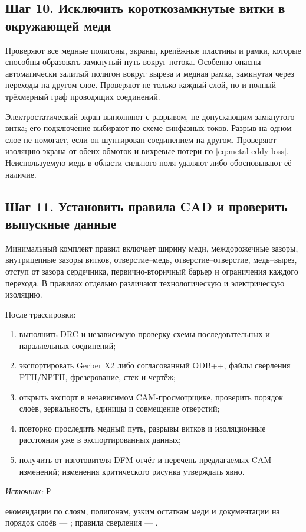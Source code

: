 \documentclass[14pt,a4paper]{extarticle}
\newcommand{\source}[1]{\par\noindent\textit{Источник:} #1\par}
\begin{document}
\subsection{Шаг 10. Исключить короткозамкнутые витки в окружающей меди}
Проверяют все медные полигоны, экраны, крепёжные пластины и рамки, которые способны образовать замкнутый путь вокруг потока. Особенно опасны автоматически залитый полигон вокруг выреза и медная рамка, замкнутая через переходы на другом слое. Проверяют не только каждый слой, но и полный трёхмерный граф проводящих соединений.

Электростатический экран выполняют с разрывом, не допускающим замкнутого витка; его подключение выбирают по схеме синфазных токов. Разрыв на одном слое не помогает, если он шунтирован соединением на другом. Проверяют изоляцию экрана от обеих обмоток и вихревые потери по \eqref{eq:metal-eddy-loss}. Неиспользуемую медь в области сильного поля удаляют либо обосновывают её наличие.

\subsection{Шаг 11. Установить правила CAD и проверить выпускные данные}
Минимальный комплект правил включает ширину меди, междорожечные зазоры, внутрицепные зазоры витков, отверстие--медь, отверстие--отверстие, медь--вырез, отступ от зазора сердечника, первично-вторичный барьер и ограничения каждого перехода. В правилах отдельно различают технологическую и электрическую изоляцию.

После трассировки:
\begin{enumerate}
\item выполнить DRC и независимую проверку схемы последовательных и параллельных соединений;
\item экспортировать Gerber X2 либо согласованный ODB++, файлы сверления PTH/NPTH, фрезерование, стек и чертёж;
\item открыть экспорт в независимом CAM-просмотрщике, проверить порядок слоёв, зеркальность, единицы и совмещение отверстий;
\item повторно проследить медный путь, разрывы витков и изоляционные расстояния уже в экспортированных данных;
\item получить от изготовителя DFM-отчёт и перечень предлагаемых CAM-изменений; изменения критического рисунка утверждать явно.
\end{enumerate}
\source Рекомендации по слоям, полигонам, узким остаткам меди и документации на порядок слоёв --- \cite{web17}; правила сверления --- \cite{web18}.
\end{document}
